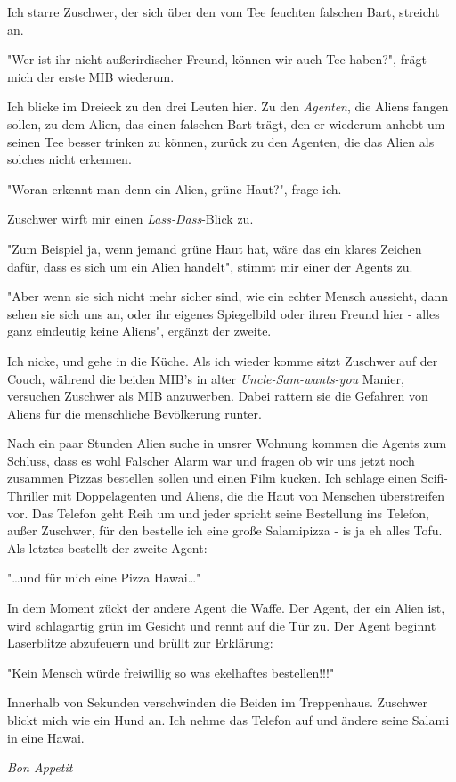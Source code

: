 \documentclass[11pt]{article}
\begin{document}
Ich starre Zuschwer, der sich über den vom Tee feuchten falschen Bart,
streicht an.
\begin{center}
"Wer ist ihr nicht außerirdischer Freund, können wir auch Tee haben?",
frägt mich der erste MIB wiederum.
\end{center}
Ich blicke im Dreieck zu den drei Leuten hier. Zu den \emph{Agenten}, die
Aliens fangen sollen, zu dem Alien, das einen falschen Bart trägt,
den er wiederum anhebt um seinen Tee besser trinken zu können, zurück
zu den Agenten, die das Alien als solches nicht erkennen. 
\begin{center}
"Woran erkennt man denn ein Alien, grüne Haut?", frage ich.
\end{center}
Zuschwer wirft mir einen \emph{Lass-Dass}-Blick zu. 
\begin{center}
"Zum Beispiel ja, wenn jemand grüne Haut hat, wäre das ein klares
Zeichen dafür, dass es sich um ein Alien handelt", stimmt mir einer
der Agents zu.
\end{center}
\begin{center}
"Aber wenn sie sich nicht mehr sicher sind, wie ein echter Mensch
aussieht, dann sehen sie sich uns an, oder ihr eigenes Spiegelbild
oder ihren Freund hier - alles ganz eindeutig keine Aliens", ergänzt
der zweite.
\end{center}
Ich nicke, und gehe in die Küche. Als ich wieder komme sitzt Zuschwer
auf der Couch, während die beiden MIB's in alter \emph{Uncle-Sam-wants-you}
Manier, versuchen Zuschwer als MIB anzuwerben. Dabei rattern sie die
Gefahren von Aliens für die menschliche Bevölkerung runter. 

\noindent Nach ein paar Stunden Alien suche in unsrer Wohnung kommen
die Agents zum Schluss, dass es wohl Falscher Alarm war und fragen ob
wir uns jetzt noch zusammen Pizzas bestellen sollen und einen Film
kucken. Ich schlage einen Scifi-Thriller mit Doppelagenten und Aliens,
die die Haut von Menschen überstreifen vor. Das Telefon geht Reih um
und jeder spricht seine Bestellung ins Telefon, außer Zuschwer, für
den bestelle ich eine große Salamipizza - is ja eh alles Tofu. Als
letztes bestellt der zweite Agent:
\begin{center}
"\ldots{}und für mich eine Pizza Hawai\ldots{}"
\end{center}
In dem Moment zückt der andere Agent die Waffe. Der Agent, der ein
Alien ist, wird schlagartig grün im Gesicht und rennt auf die Tür zu. 
Der Agent beginnt Laserblitze abzufeuern und brüllt zur Erklärung:
\begin{center}
"Kein Mensch würde freiwillig so was ekelhaftes bestellen!!!"
\end{center}
Innerhalb von Sekunden verschwinden die Beiden im Treppenhaus.
Zuschwer blickt mich wie ein Hund an. Ich nehme das Telefon auf
und ändere seine Salami in eine Hawai.
\begin{center}
\emph{Bon Appetit}
\end{center}
\newpage
\end{document}

